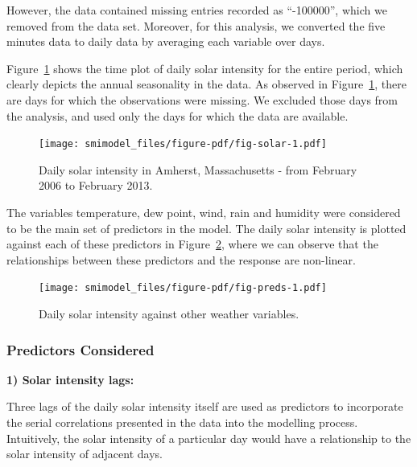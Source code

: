 \documentclass[11pt,a4paper,]{article}
\begin{document}
However, the data contained missing entries recorded as ``-100000'',
which we removed from the data set. Moreover, for this analysis, we
converted the five minutes data to daily data by averaging each variable
over days.

Figure~\ref{fig-solar} shows the time plot of daily solar intensity for
the entire period, which clearly depicts the annual seasonality in the
data. As observed in Figure~\ref{fig-solar}, there are days for which
the observations were missing. We excluded those days from the analysis,
and used only the days for which the data are available.

\begin{figure}

{\centering \texttt{[image: smimodel\_files/figure-pdf/fig-solar-1.pdf]}

}

\caption{\label{fig-solar}Daily solar intensity in Amherst,
Massachusetts - from February 2006 to February 2013.}

\end{figure}

The variables temperature, dew point, wind, rain and humidity were
considered to be the main set of predictors in the model. The daily
solar intensity is plotted against each of these predictors in
Figure~\ref{fig-preds}, where we can observe that the relationships
between these predictors and the response are non-linear.

\begin{figure}

{\centering \texttt{[image: smimodel\_files/figure-pdf/fig-preds-1.pdf]}

}

\caption{\label{fig-preds}Daily solar intensity against other weather
variables.}

\end{figure}

\hypertarget{predictors-considered-1}{%
\subsubsection{Predictors Considered}\label{predictors-considered-1}}

\textbf{1) Solar intensity lags:}

Three lags of the daily solar intensity itself are used as predictors to
incorporate the serial correlations presented in the data into the
modelling process. Intuitively, the solar intensity of a particular day
would have a relationship to the solar intensity of adjacent days.
\end{document}

